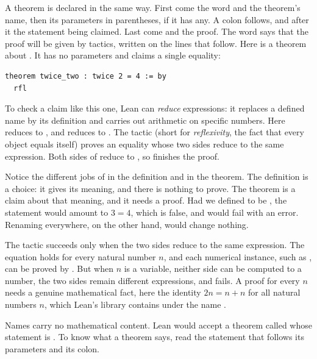 A theorem is declared in the same way. First come the word  and the theorem's name, then its parameters in parentheses, if it has any. A colon follows, and after it the statement being claimed. Last come \code{:=} and the proof. The word  says that the proof will be given by tactics, written on the lines that follow. Here is a theorem about . It has no parameters and claims a single equality:
\par\noindent\begin{minipage}{\linewidth}
\begin{lstlisting}
theorem twice_two : twice 2 = 4 := by
  rfl
\end{lstlisting}
\end{minipage}\par

To check a claim like this one, Lean can \emph{reduce} expressions: it replaces a defined name by its definition and carries out arithmetic on specific numbers. Here  reduces to , and  reduces to . The tactic  (short for \emph{reflexivity}, the fact that every object equals itself) proves an equality whose two sides reduce to the same expression. Both sides of  reduce to , so  finishes the proof.

Notice the different jobs of \code{:=} in the definition and \code{=} in the theorem. The definition is a choice: it gives  its meaning, and there is nothing to prove. The theorem is a claim about that meaning, and it needs a proof. Had we defined  to be , the statement  would amount to $3=4$, which is false, and  would fail with an error. Renaming  everywhere, on the other hand, would change nothing.

The tactic  succeeds only when the two sides reduce to the same expression. The equation  holds for every natural number $n$, and each numerical instance, such as , can be proved by . But when $n$ is a variable, neither side can be computed to a number, the two sides remain different expressions, and  fails. A proof for every $n$ needs a genuine mathematical fact, here the identity $2n=n+n$ for all natural numbers $n$, which Lean's library contains under the name .

Names carry no mathematical content. Lean would accept a theorem called  whose statement is . To know what a theorem says, read the statement that follows its parameters and its colon.

